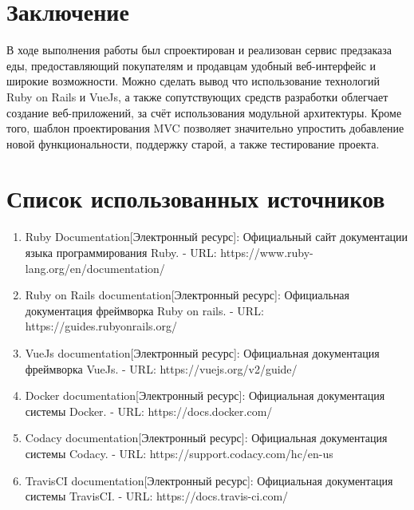 \newpage
{}
{}
\section*{Заключение}
{
В ходе выполнения работы был спроектирован и реализован сервис предзаказа еды, предоставляющий покупателям и продавцам удобный веб-интерфейс и широкие возможности. Можно сделать вывод что использование технологий Ruby on Rails и VueJs, а также сопутствующих средств разработки облегчает создание веб-приложений, за счёт использования модульной архитектуры. Кроме того, шаблон проектирования MVC позволяет значительно упростить добавление новой функциональности, поддержку старой, а также тестирование проекта.
}

\newpage
{}
{}
\section*{Список использованных источников}
{
	\begin{enumerate}[label=\arabic*]
	\item {Ruby Documentation[Электронный ресурс]: Официальный сайт документации языка программирования Ruby. - URL: https://www.ruby-lang.org/en/documentation/}\label{src_ruby}
	\item {Ruby on Rails documentation[Электронный ресурс]: Официальная документация фреймворка Ruby on rails. - URL: https://guides.rubyonrails.org/}\label{src_rails}
	\item {VueJs documentation[Электронный ресурс]: Официальная документация фреймворка VueJs. - URL: https://vuejs.org/v2/guide/}\label{src_vue}
  \item {Docker documentation[Электронный ресурс]: Официальная документация системы Docker. - URL: https://docs.docker.com/}\label{src_docker}
  \item {Codacy documentation[Электронный ресурс]: Официальная документация системы Codacy. - URL: https://support.codacy.com/hc/en-us}\label{src_codacy}
  \item {TravisCI documentation[Электронный ресурс]: Официальная документация системы TravisCI. - URL: https://docs.travis-ci.com/}\label{src_travis}
	\end{enumerate}
}

\newpage
{}
{}


